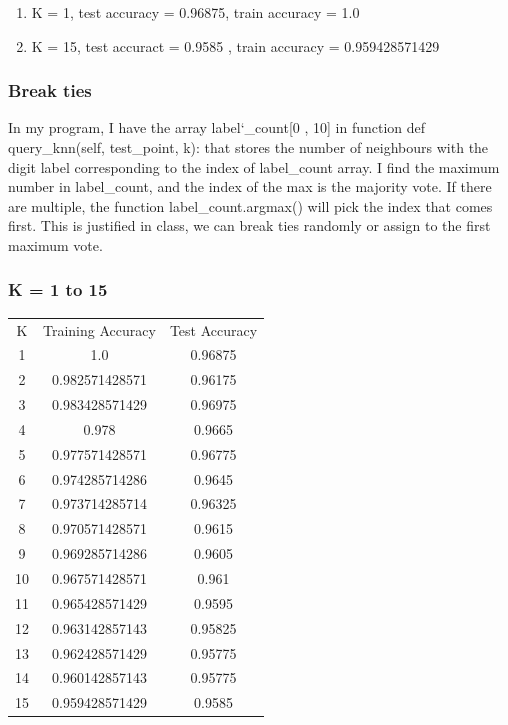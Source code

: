 \documentclass[letterpaper]{article}
\begin{document}
\begin{enumerate}[label=(\alph*)]
\item K = 1, test accuracy = 0.96875, train accuracy = 1.0
\item K = 15, test accuract = 0.9585 , train accuracy  = 0.959428571429 
\end{enumerate}

\subsubsection{Break ties}
In my program, I have the array label\char`_count[0 , 10] in function def query\_knn(self, test\_point, k): that stores the number of neighbours with the digit label corresponding to the index of label\_count array. I find the maximum number in label\_count, and the index of the max is the majority vote. If there are multiple, the function label\_count.argmax() will pick the index that comes first. This is justified in class, we can break ties randomly or assign to the first maximum vote.

\subsubsection{K = 1 to 15}

\begin{center}
\begin{tabular}{ |c|c|c| } 
 \hline
 K & Training Accuracy & Test Accuracy  \\
 1  &  1.0  &  0.96875 \\
2  &  0.982571428571  &  0.96175 \\
3  &  0.983428571429  &  0.96975  \\
4  &  0.978  &  0.9665 \\
5  &  0.977571428571  &  0.96775 \\
6  &  0.974285714286  &  0.9645  \\
7  &  0.973714285714  &  0.96325 \\
8  &  0.970571428571  &  0.9615  \\
9  &  0.969285714286  &  0.9605  \\
10  &  0.967571428571  &  0.961 \\
11  &  0.965428571429  &  0.9595 \\
12  &  0.963142857143  &  0.95825 \\
13  &  0.962428571429  &  0.95775 \\
14  &  0.960142857143  &  0.95775 \\
15  &  0.959428571429  &  0.9585  \\
 \hline
\end{tabular}
\end{center}
\end{document}

